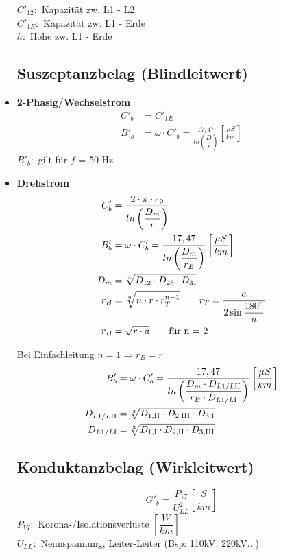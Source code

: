 \begin{itemize}
$C'_{12}:$ Kapazität zw. L1 - L2\\
$C'_{1E}:$ Kapazität zw. L1 - Erde\\
$h:$ Höhe zw. L1 - Erde

\subsection{Suszeptanzbelag (Blindleitwert)}
    \item[]{\textbf{2-Phasig/Wechselstrom}}
    \begin{align*}
        C'_b &= C'_{1E}\\
        B'_b &= \omega \cdot C'_b = \frac{17,47}{ln\left(\dfrac{D}{r} \right)} \left[ \frac{\mu S}{km} \right]
    \end{align*}
    $B'_b:$ gilt für $f$ = 50 Hz\\

\item[]{\textbf{Drehstrom}}
    \begin{align*}
        C'_b &= \frac{2\cdot \pi \cdot \varepsilon_0}{ln \left( \dfrac{D_m}{r} \right)} \\
        B'_b &= \omega \cdot C'_b = \frac{17,47}{ln\left(\dfrac{D_m}{r_B} \right)} \left[ \frac{\mu S}{km} \right]\\
        D_{m} &= \sqrt[3]{D_{12} \cdot D_{23} \cdot D_{31}}\\
        r_B &= \sqrt[n]{n \cdot r \cdot r_{T}^{n-1}} \qquad r_T = \frac{a}{2 \sin \dfrac{180 \degree}{n}} \\
        r_B &= \sqrt{r \cdot a} \qquad \textnormal{für n = 2}
    \end{align*}

    Bei Einfachleitung $n=1 \Rightarrow r_B = r$\\

    \begin{align*}
        B'_b &= \omega \cdot C'_b = \frac{17,47}{ln\left(\dfrac{D_m \cdot D_{L1/L\RN{2}}}{r_B \cdot D_{L1/L \RN{1}}} \right)} \left[ \frac{\mu S}{km} \right]\\
        D_{L1/L\RN{2}} &= \sqrt[3]{D_{1,\RN{2}} \cdot D_{2,\RN{3}} \cdot D_{3,\RN{1}}}\\
        D_{L1/L\RN{1}} &= \sqrt[3]{D_{1,\RN{1}} \cdot D_{2,\RN{2}} \cdot D_{3,\RN{3}}}\\
    \end{align*}

\subsection{Konduktanzbelag (Wirkleitwert)}
\begin{equation*}
    G'_b = \dfrac{P_{\mathit{VI}}}{U^2_{\mathit{LL}}} \left[\dfrac{S}{km}\right]
\end{equation*}
$P_{\mathit{VI}}:$ Korona-/Isolationsverluste $\left[\dfrac{W}{km} \right]$\\
$U_{\mathit{LL}}:$ Nennspannung, Leiter-Leiter (Bsp: 110kV, 220kV...)
\end{itemize}
